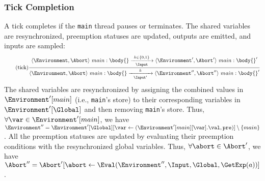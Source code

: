 \subsubsection{Tick Completion}
A tick completes if the \verb$main$ thread pauses or
terminates. The shared variables are resynchronized, preemption statuses
are updated, outputs are emitted, and inputs are sampled:
\begin{equation*}
	\tag{tick}
	\label{forec:tick}
	\frac{
			\langle \Environment, \Abort \rangle ~ main:\body{}
				\xrightarrow[~~\Input~~]{k \in \lbrace 0, 1 \rbrace} 
			\langle \Environment', \Abort' \rangle ~ main:\body{}'
		}{
			\langle \Environment, \Abort \rangle ~ main:\body{}
				\xrightarrow[~~\Input'~~]{k} 
			\langle \Environment'', \Abort'' \rangle ~ main:\body{}'
		}
\end{equation*}
The shared variables are resynchronized by assigning the 
combined values in $\Environment'[main]$ (i.e., \verb$main$'s store) to
their corresponding variables in $\Environment'[\Global]$ and then removing \verb$main$'s store. Thus, 
$\forall \var \in \Environment'[main]$, we have 
$\Environment'' = \Environment'[\Global][\var \gets (\Environment'[main][\var].\val, \texttt{pre})] \setminus \{main\}$.
All the preemption statuses are updated by evaluating their preemption 
conditions with the resynchronized global variables. Thus, 
$\forall \abort \in \Abort'$, we have $\Abort'' = \Abort'[\abort \gets \Eval(\Environment'', \Input, \Global, \GetExp(a))]$.



